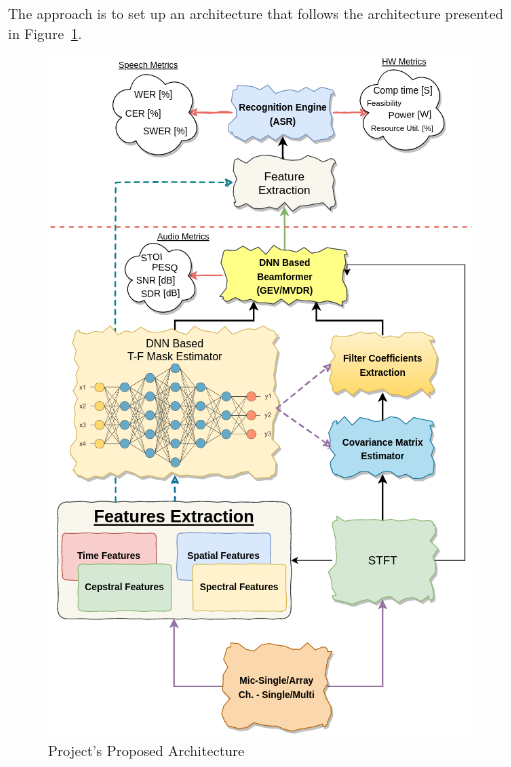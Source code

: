 The approach is to set up an architecture 
that follows the architecture presented in
Figure~\ref{fig:proj_blocks}.
\begin{figure}[H]
	\vspace{-2.65cm}
	\centering
	\includegraphics[width=\textwidth]
	{Introduction/images/proj_blocks2}
	\caption{Project's Proposed Architecture}\label{fig:proj_blocks}
\end{figure}

